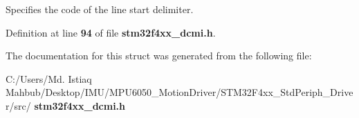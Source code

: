 Specifies the code of the line start delimiter. 

Definition at line \textbf{ 94} of file \textbf{ stm32f4xx\+\_\+dcmi.\+h}.



The documentation for this struct was generated from the following file\+:\begin{DoxyCompactItemize}
\item 
C\+:/\+Users/\+Md. Istiaq Mahbub/\+Desktop/\+I\+M\+U/\+M\+P\+U6050\+\_\+\+Motion\+Driver/\+S\+T\+M32\+F4xx\+\_\+\+Std\+Periph\+\_\+\+Driver/src/\textbf{ stm32f4xx\+\_\+dcmi.\+h}\end{DoxyCompactItemize}

